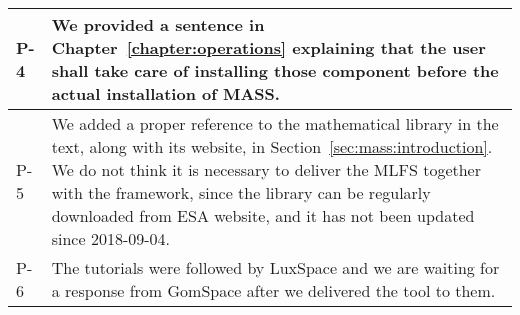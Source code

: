\begin{longtable}{|p{1.5cm}|p{12cm}|@{}}
P-4&
\begin{minipage}{12cm}
We provided a sentence in Chapter~\ref{chapter:operations} explaining that the user shall take care of installing those component before the actual installation of MASS.
\end{minipage}\\
\hline

P-5&
\begin{minipage}{12cm}
We added a proper reference to the mathematical library in the text, along with its website, in Section~\ref{sec:mass:introduction}.
We do not think it is necessary to deliver the MLFS together with the framework, since the library can be regularly downloaded from ESA website, and it has not been updated since 2018-09-04.
\end{minipage}\\
\hline

P-6&
\begin{minipage}{12cm}
The tutorials were followed by LuxSpace and we are waiting for a response from GomSpace after we delivered the tool to them.
\end{minipage}\\
\hline



\end{longtable}
\normalsize

\clearpage
